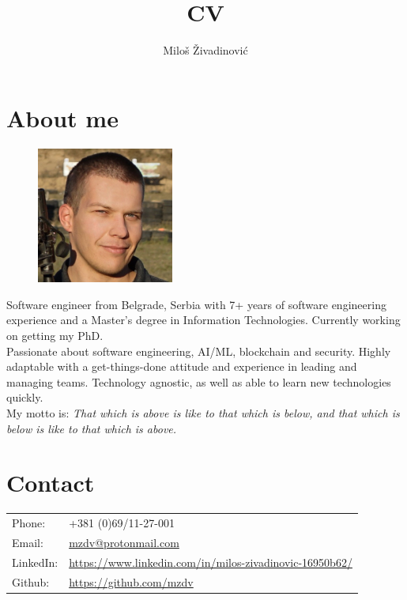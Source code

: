 \documentclass[a4paper]{article}
\title{CV}
\author{Miloš Živadinović}
\date{}
\begin{document}
\maketitle

\section{About me}
\begin{figure}
    \vspace{-1.3em}
    \includegraphics[width=0.4\textwidth]{cv.jpg}
\end{figure}

Software engineer from Belgrade, Serbia with 7+ years
of software
engineering experience and a Master’s degree in Information Technologies.
Currently working on getting my PhD. \\

\noindent Passionate about software engineering, AI/ML,
blockchain and security.
Highly adaptable with a get-things-done attitude and
experience in leading and managing teams. Technology agnostic, as well as
able to learn new technologies quickly. \\

\noindent My motto is: \emph{That which is above is like to that which is below,
    and that which is below is like to that which is above.}

\section{Contact}
\begin{tabular}{@{}l | l}
    Phone:    & +381 (0)69/11-27-001                                                                                                    \\
    Email:    & \href{mailto:mzdv@protonmail.com}{mzdv@protonmail.com}                                                                  \\
    LinkedIn: & \href{https://www.linkedin.com/in/milos-zivadinovic-16950b62/}{https://www.linkedin.com/in/milos-zivadinovic-16950b62/} \\
    Github:   & \href{https://github.com/mzdv}{https://github.com/mzdv}
\end{tabular}
\end{document}
